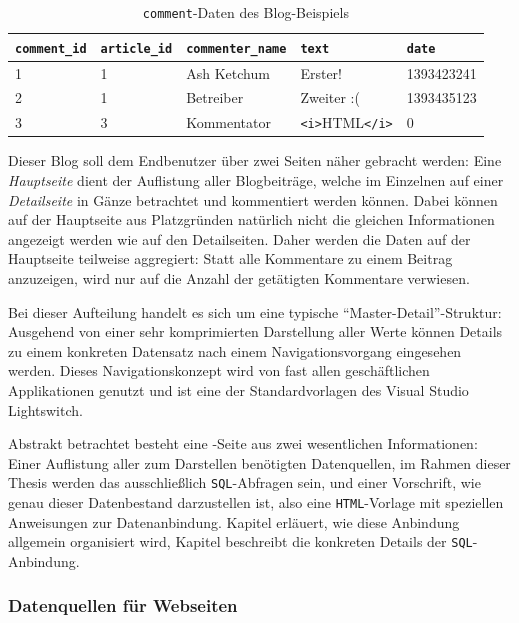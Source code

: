 \begin{table}[h]
  \centering
  \begin{tabularx}{\linewidth}{ l l l X l }
    \texttt{comment\_id}&\texttt{article\_id}&\texttt{commenter\_name}&\texttt{text}&\texttt{date}\\
    \hline
    1&1&Ash Ketchum&Erster!&1393423241\\
    2&1&Betreiber&Zweiter :(&1393435123\\
    3&3&Kommentator&\texttt{<i>}HTML\texttt{</i>}&0\\
  \end{tabularx}
  \caption{\texttt{comment}-Daten des Blog-Beispiels}
  \label{tab:ui-concept-data-comment}
\end{table}

Dieser Blog soll dem Endbenutzer über zwei Seiten näher gebracht werden: Eine \textit{Hauptseite} dient der Auflistung aller Blogbeiträge, welche im Einzelnen auf einer \textit{Detailseite} in Gänze betrachtet und kommentiert werden können. Dabei können auf der Hauptseite aus Platzgründen natürlich nicht die gleichen Informationen angezeigt werden wie auf den Detailseiten. Daher werden die Daten auf der Hauptseite teilweise aggregiert: Statt alle Kommentare zu einem Beitrag anzuzeigen, wird nur auf die Anzahl der getätigten Kommentare verwiesen.

Bei dieser Aufteilung handelt es sich um eine typische "`Master-Detail"'-Struktur: Ausgehend von einer sehr komprimierten Darstellung aller Werte können Details zu einem konkreten Datensatz nach einem Navigationsvorgang eingesehen werden. Dieses Navigationskonzept wird von fast allen geschäftlichen Applikationen genutzt und ist eine der Standardvorlagen des Visual Studio Lightswitch.

Abstrakt betrachtet besteht eine \idename{}-Seite aus zwei wesentlichen Informationen: Einer Auflistung aller zum Darstellen benötigten Datenquellen, im Rahmen dieser Thesis werden das ausschließlich \texttt{SQL}-Abfragen sein, und einer Vorschrift, wie genau dieser Datenbestand darzustellen ist, also eine \texttt{HTML}-Vorlage mit speziellen Anweisungen zur Datenanbindung. Kapitel  erläuert, wie diese Anbindung allgemein organisiert wird, Kapitel  beschreibt die konkreten Details der \texttt{SQL}-Anbindung.

\subsubsection{Datenquellen für Webseiten}
\label{sec:page-data-sources}

